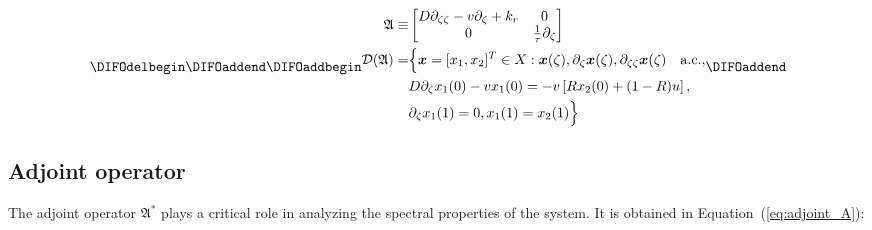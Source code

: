 \begin{equation} \label{eq:operator_A}
    \DIFdelbegin %
\DIFdelend \DIFaddbegin \begin{aligned}
        \mathfrak{A} \equiv&
        \begin{bmatrix}
            D \partial_{\zeta \zeta} - v \partial_\zeta + k_r & 0 \\
            0 & \frac{1}{\tau} \partial_\zeta
        \end{bmatrix}\\
        \mathcal{D}(\mathfrak{A}) =& \Bigl\{ \bm{x} = [x_1, x_2]^T \in X:
        \bm{x}(\zeta), \partial_\zeta \bm{x}(\zeta), \partial_{\zeta \zeta} \bm{x}(\zeta) \quad \mathrm{a.c.},\\
        &D \partial_\zeta x_1(0) - v x_1(0) = -v \left[ R x_2(0) + (1-R) u \right],\\
        &\partial_\zeta x_1(1) = 0,
        x_1(1) = x_2(1) \Bigr\}
    \end{aligned}\DIFaddend 
\end{equation}

\subsection{Adjoint operator}

The adjoint operator $\mathfrak{A}^*$ plays a critical role in analyzing the spectral properties of the system. It is obtained in Equation~(\ref{eq:adjoint_A}):

